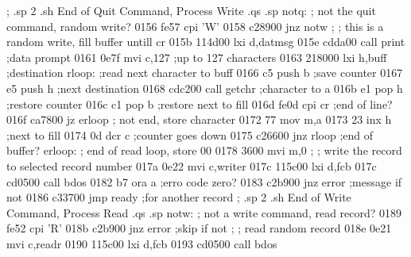                          ;
.sp 2
.sh
                          End of Quit Command, Process Write
.qs
.sp
                         notq:
                         ;        not the quit command, random write?
0156 fe57                         cpi    'W'
0158 c28900                       jnz    notw
                         ;
                         ;        this is a random write, fill buffer untill cr
015b 114d00                       lxi    d,datmsg
015e cdda00                       call   print     ;data prompt
0161 0e7f                         mvi    c,127     ;up to 127 characters
0163 218000                       lxi    h,buff    ;destination
                         rloop:   ;read next character to buff
0166 c5                           push   b         ;save counter
0167 e5                           push   h         ;next destination
0168 cdc200                       call   getchr    ;character to a
016b e1                           pop    h         ;restore counter
016c c1                           pop    b         ;restore next to fill
016d fe0d                         cpi    cr        ;end of line?
016f ca7800                       jz     erloop
                         ;        not end, store character
0172 77                           mov    m,a
0173 23                           inx    h         ;next to fill
0174 0d                           dcr    c         ;counter goes down
0175 c26600                       jnz    rloop     ;end of buffer?
                         erloop:
                         ;        end of read loop, store 00
0178 3600                         mvi    m,0
                         ;
                         ;        write the record to selected record number
017a 0e22                         mvi    c,writer
017c 115c00                       lxi    d,fcb
017c cd0500                       call   bdos
0182 b7                           ora    a         ;erro code zero?
0183 c2b900                       jnz    error     ;message if not
0186 c33700                       jmp    ready     ;for another record
                         ;
.sp 2
.sh
                          End of Write Command, Process Read
.qs
.sp
                         notw:
                         ;        not a write command, read record?
0189 fe52                         cpi    'R'
018b c2b900                       jnz    error     ;skip if not
                         ;
                         ;        read random record
018e 0e21                         mvi    c,readr
0190 115c00                       lxi    d,fcb
0193 cd0500                       call   bdos
